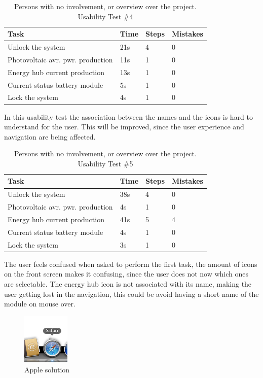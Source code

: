 \begin{table}[H]
\begin{tabular}{ | l | l | l | l |}
	\hline
	Task 					     &		Time 	& 	Steps 	& 	Mistakes 		\\ \hline
	Unlock the system 			     & 		21s		& 	4		& 	0			\\ \hline
	Photovoltaic avr. pwr. production  & 		11s		&	1		& 	0			\\ \hline
	Energy hub current production      & 		13s		& 	1		& 	0			\\ \hline
	Current status battery module 	     & 		5s		& 	1		& 	0			\\ \hline
	Lock the system 			     & 		4s		& 	1		& 	0			\\ \hline
\end{tabular}
\caption{Persons with no involvement, or overview over the project.  Usability Test \#4}
\end{table}
In this usability test the association between the names and the icons is hard to understand for the user. This will be improved, since the user experience and navigation are being affected.\p

\begin{table}[H]
\begin{tabular}{ | l | l | l | l |}
	\hline
	Task 					      & 	Time 	& 	Steps 	& 	Mistakes 		\\ \hline
	Unlock the system 			      & 	38s		& 	4		& 	0			\\ \hline
	Photovoltaic avr. pwr. production   &		4s	    	& 	1		& 	0			\\ \hline
	Energy hub current production 	      & 	41s		& 	5 		& 	4 			\\ \hline
	Current status battery module 	      & 	4s		& 	1		& 	0			\\ \hline
	Lock the system 			      & 	3s		& 	1		& 	0			\\ \hline
\end{tabular}
\caption{Persons with no involvement, or overview over the project. Usability Test \#5}
\end{table}
The user feels confused when asked to perform the first task, the amount of icons on the front screen makes it confusing, since the user does not now which ones are selectable. The energy hub icon is not associated with its name, making the user getting lost in the navigation, this could be avoid having a short name of the module on mouse over.

\begin{figure}[H]
	\center
		\includegraphics[width=0.2\textwidth]{images/legend.png}
   	\caption{Apple solution}
\end{figure}

